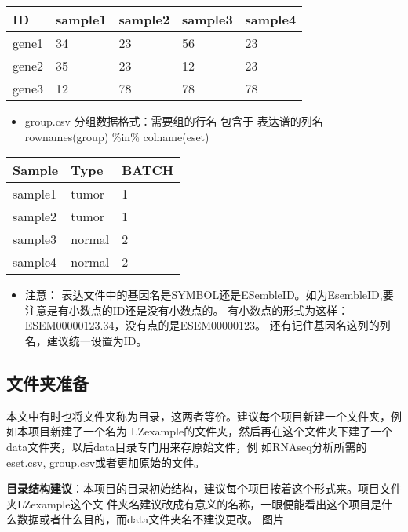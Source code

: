 \documentclass[
]{book}
\providecommand{\tightlist}{%
  \setlength{\itemsep}{0pt}\setlength{\parskip}{0pt}}
\begin{document}
\begin{longtable}[]{@{}lllll@{}}
\toprule\noalign{}
ID & sample1 & sample2 & sample3 & sample4 \\
\midrule\noalign{}
\endhead
\bottomrule\noalign{}
\endlastfoot
gene1 & 34 & 23 & 56 & 23 \\
gene2 & 35 & 23 & 12 & 23 \\
gene3 & 12 & 78 & 78 & 78 \\
\end{longtable}

\begin{itemize}
\tightlist
\item
  group.csv 分组数据格式：需要组的行名 包含于 表达谱的列名 rownames(group) \%in\% colname(eset)
\end{itemize}

\begin{longtable}[]{@{}lll@{}}
\toprule\noalign{}
Sample & Type & BATCH \\
\midrule\noalign{}
\endhead
\bottomrule\noalign{}
\endlastfoot
sample1 & tumor & 1 \\
sample2 & tumor & 1 \\
sample3 & normal & 2 \\
sample4 & normal & 2 \\
\end{longtable}

\begin{itemize}
\tightlist
\item
  注意：
  表达文件中的基因名是SYMBOL还是ESembleID。如为EsembleID,要注意是有小数点的ID还是没有小数点的。
  有小数点的形式为这样：ESEM00000123.34，没有点的是ESEM00000123。
  还有记住基因名这列的列名，建议统一设置为ID。
\end{itemize}

\subsection{文件夹准备}\label{ux6587ux4ef6ux5939ux51c6ux5907}

本文中有时也将文件夹称为目录，这两者等价。建议每个项目新建一个文件夹，例如本项目新建了一个名为
LZexample的文件夹，然后再在这个文件夹下建了一个data文件夹，以后data目录专门用来存原始文件，例
如RNAseq分析所需的eset.csv, group.csv或者更加原始的文件。

\textbf{目录结构建议}：本项目的目录初始结构，建议每个项目按着这个形式来。项目文件夹LZexample这个文
件夹名建议改成有意义的名称，一眼便能看出这个项目是什么数据或者什么目的，而data文件夹名不建议更改。
图片
\end{document}
